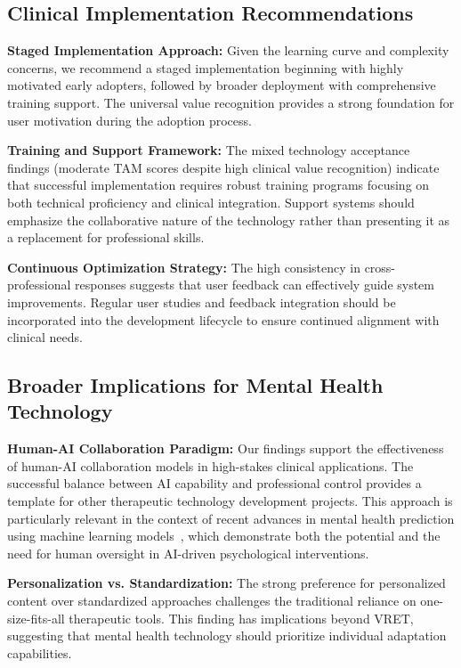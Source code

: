 \documentclass[]{interact}
\begin{document}
\subsection{Clinical Implementation Recommendations}

\textbf{Staged Implementation Approach:} Given the learning curve and complexity concerns, we recommend a staged implementation beginning with highly motivated early adopters, followed by broader deployment with comprehensive training support. The universal value recognition provides a strong foundation for user motivation during the adoption process.

\textbf{Training and Support Framework:} The mixed technology acceptance findings (moderate TAM scores despite high clinical value recognition) indicate that successful implementation requires robust training programs focusing on both technical proficiency and clinical integration. Support systems should emphasize the collaborative nature of the technology rather than presenting it as a replacement for professional skills.

\textbf{Continuous Optimization Strategy:} The high consistency in cross-professional responses suggests that user feedback can effectively guide system improvements. Regular user studies and feedback integration should be incorporated into the development lifecycle to ensure continued alignment with clinical needs.

\subsection{Broader Implications for Mental Health Technology}

\textbf{Human-AI Collaboration Paradigm:} Our findings support the effectiveness of human-AI collaboration models in high-stakes clinical applications. The successful balance between AI capability and professional control provides a template for other therapeutic technology development projects. This approach is particularly relevant in the context of recent advances in mental health prediction using machine learning models~\cite{kamoji2024mental}, which demonstrate both the potential and the need for human oversight in AI-driven psychological interventions.

\textbf{Personalization vs. Standardization:} The strong preference for personalized content over standardized approaches challenges the traditional reliance on one-size-fits-all therapeutic tools. This finding has implications beyond VRET, suggesting that mental health technology should prioritize individual adaptation capabilities.
\end{document}
